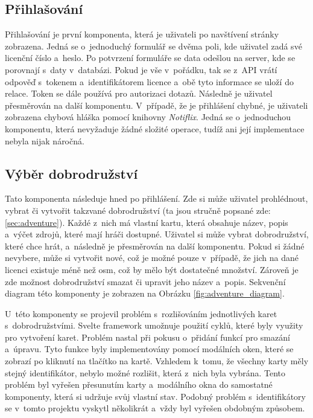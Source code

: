 \subsection{Přihlašování}
Přihlašování je první komponenta, která je uživateli po navštívení stránky zobrazena. Jedná se o~jednoduchý formulář se dvěma poli, kde uživatel zadá své licenční číslo a~heslo. Po potvrzení formuláře se data odešlou na server, kde se porovnají s~daty v~databázi. Pokud je vše v~pořádku, tak se z~API vrátí odpověď s~tokenem a~identifikátorem licence a~obě tyto informace se uloží do relace. Token se dále používá pro autorizaci dotazů. Následně je uživatel přesměrován na další komponentu. V~případě, že je přihlášení chybné, je uživateli zobrazena chybová hláška pomocí knihovny \textit{Notiflix}. Jedná se o~jednoduchou komponentu, která nevyžaduje žádné složité operace, tudíž ani její implementace nebyla nijak náročná.

\subsection{Výběr dobrodružství}
Tato komponenta následuje hned po přihlášení. Zde si může uživatel prohlédnout, vybrat či vytvořit takzvané dobrodružství (ta jsou stručně popsané zde: \ref{sec:adventure}). Každé z~nich má vlastní kartu, která obsahuje název, popis a~výčet zdrojů, které mají hráči dostupné. Uživatel si může vybrat dobrodružství, které chce hrát, a~následně je přesměrován na další komponentu. Pokud si žádné nevybere, může si vytvořit nové, což je možné pouze v~případě, že jich na dané licenci existuje méně než osm, což by mělo být dostatečné množství. Zároveň je zde možnost dobrodružství smazat či upravit jeho název a~popis. Sekvenční diagram této komponenty je zobrazen na Obrázku \ref{fig:adventure_diagram}.

U~této komponenty se projevil problém s~rozlišováním jednotlivých karet s~dobrodružstvími. Svelte framework umožnuje použití cyklů, které byly využity pro vytvoření karet. Problém nastal při pokusu o~přidání funkcí pro smazání a~úpravu. Tyto funkce byly implementovány pomocí modálních oken, které se zobrazí po kliknutí na tlačítko na kartě. Vzhledem k~tomu, že všechny karty měly stejný identifikátor, nebylo možné rozlišit, která z~nich byla vybrána. Tento problém byl vyřešen přesunutím karty a~modálního okna do samostatné komponenty, která si udržuje svůj vlastní stav. Podobný problém s~identifikátory se v~tomto projektu vyskytl několikrát a~vždy byl vyřešen obdobným způsobem.

